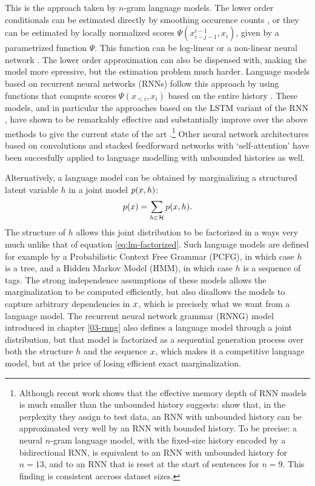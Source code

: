     This is the approach taken by $n$-gram language models. The lower order conditionals can be estimated directly by smoothing occurence counts \citep{chen1999empirical,kneser1995improved}, or they can be estimated by locally normalized scores $\Psi(x_{i-j-1}^{i-1}, x_i)$, given by a parametrized function $\Psi$. This function can be log-linear or a non-linear neural network \citep{rosenfeld1996loglinear,bengio2003neural}. The lower order approximation can also be dispensed with, making the model more epressive, but the estimation problem much harder. Language models based on recurrent neural networks (RNNs) follow this approach by using functions that compute scores $\Psi(x_{<i}, x_i)$ based on the entire history \citep{mikolov2010recurrent}. These models, and in particular the approaches based on the LSTM variant of the RNN \citep{hochreiter1997long}, have shown to be remarkably effective and substantially improve over the above methods to give the current state of the art \citep{zaremba2014recurrent,jozefowicz2016exploring,melis2017state}.\footnote{Although recent work shows that the effective memory depth of RNN models is much smaller than the unbounded history suggests: \citet{chelba2017n} show that, in the perplexity they assign to test data, an RNN with unbounded history can be approximated very well by an RNN with bounded history. To be precise: a neural $n$-gram language model, with the fixed-size history encoded by a bidirectional RNN, is equivalent to an RNN with unbounded history for $n=13$, and to an RNN that is reset at the start of sentences for $n=9$. This finding is consistent accross dataset sizes.} Other neural network architectures based on convolutions \citep{kalchbrenner2014convolutional} and stacked feedforward networks with `self-attention' \citep{vaswani2017attention} have been succesfully applied to language modelling with unbounded histories as well.

    Alternatively, a language model can be obtained by marginalizing a structured latent variable $h$ in a joint model $p(x, h)$:
    \begin{align}
      \label{eq:lm-latent}
      p( x ) = \sum_{h \in \mathcal{H}} p(x, h).
    \end{align}
    The structure of $h$ allows this joint distribution to be factorized in a ways very much unlike that of equation \ref{eq:lm-factorized}. Such language models are defined for example by a Probabilistic Context Free Grammar (PCFG), in which case $h$ is a tree, and a Hidden Markov Model (HMM), in which case $h$ is a sequence of tags. The strong independence assumptions of these models allows the marginalization to be computed efficiently, but also disallows the models to capture arbitrary dependencies in $x$, which is precisely what we want from a language model. The recurrent neural network grammar (RNNG) model introduced in chapter \ref{03-rnng} also defines a language model through a joint distribution, but that model is factorized as a sequential generation process over both the structure $h$ and the sequence $x$, which makes it a competitive language model, but at the price of losing efficient exact marginalization.

